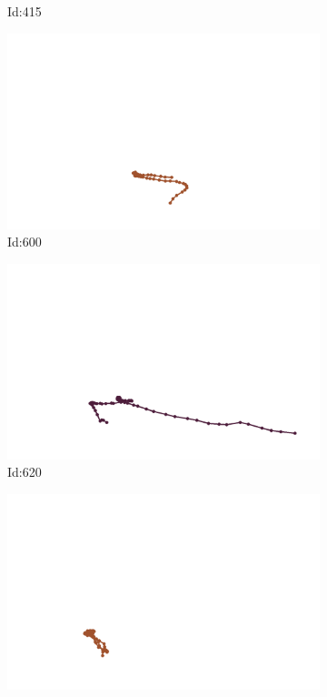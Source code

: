 \documentclass[12pt,twoside]{report}
\begin{document}
\begin{figure}
\begin{subfigure}[b]{0.20\textwidth}
\caption{Id:415}
\end{subfigure}
\begin{subfigure}[b]{0.20\textwidth}
\centering
\includegraphics[width=\textwidth]{../trajectories/600.png}
\caption{Id:600}
\end{subfigure}
\begin{subfigure}[b]{0.20\textwidth}
\centering
\includegraphics[width=\textwidth]{../trajectories/620.png}
\caption{Id:620}
\end{subfigure}
\begin{subfigure}[b]{0.20\textwidth}
\centering
\includegraphics[width=\textwidth]{../trajectories/621.png}

\end{subfigure}
\end{figure}
\end{document}
